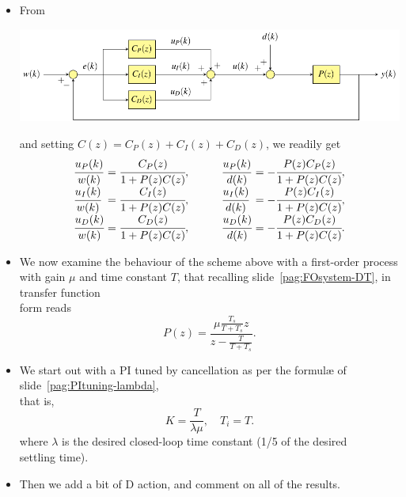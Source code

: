 \begin{frame}
\framesubtitleTC{}
\myPause
 \begin{itemize}[<+-| alert@+>]
 \item From
       \begin{center}
        \includegraphics[width=0.70\columnwidth]{./Unit-07/img/PIDloop-actions.pdf}
       \end{center}
       and setting $C(z) = C_P(z)+C_I(z)+C_D(z)$, we readily get
       \begin{displaymath}
        \begin{array}{llcll}
          \cfrac{u_P(k)}{w(k)} &\mkern-12mu =  \cfrac{C_P(z)}{1+P(z)C(z)},       &\quad&
          \cfrac{u_P(k)}{d(k)} &\mkern-12mu = -\cfrac{P(z)C_P(z)}{1+P(z)C(z)}, \\
          \cfrac{u_I(k)}{w(k)} &\mkern-12mu =  \cfrac{C_I(z)}{1+P(z)C(z)},       &\quad&
          \cfrac{u_I(k)}{d(k)} &\mkern-12mu = -\cfrac{P(z)C_I(z)}{1+P(z)C(z)}, \\
          \cfrac{u_D(k)}{w(k)} &\mkern-12mu =  \cfrac{C_D(z)}{1+P(z)C(z)},       &\quad&
          \cfrac{u_D(k)}{d(k)} &\mkern-12mu = -\cfrac{P(z)C_D(z)}{1+P(z)C(z)}.
        \end{array}
       \end{displaymath}
 \end{itemize}
\end{frame}

\begin{frame}
\framesubtitleTC{}
\myPause
 \begin{itemize}[<+-| alert@+>]
 \item We now examine the behaviour of the scheme above with a first-order process\\
       with gain $\mu$ and time constant $T$, that recalling slide~\ref{pag:FOsystem-DT}, in transfer function\\
       form reads
       \begin{displaymath}
        P(z) = \frac{\mu\frac{T_s}{T+T_s}z}{z-\frac{T}{T+T_s}}.
       \end{displaymath}
 \item We start out with a PI tuned by cancellation as per the formul{\ae} of slide~\ref{pag:PItuning-lambda},\\
       that is,
       \begin{displaymath}
        K   = \frac{T}{\lambda\mu}, \quad
        T_i = T.
       \end{displaymath}
       where $\lambda$ is the desired closed-loop time constant (1/5 of the desired\\
       settling time).
 \item Then we add a bit of D action, and comment on all of the results.
 \end{itemize}
\end{frame}

